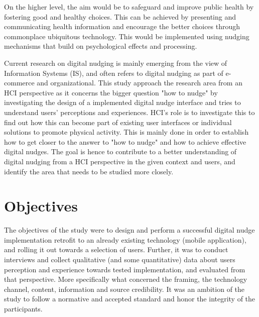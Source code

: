 On the higher level, the aim would be to safeguard and improve public health by fostering good and healthy choices. This can be achieved by presenting and communicating health information and encourage the better choices through commonplace ubiquitous technology. This would be implemented using nudging mechanisms that build on psychological effects and processing. 


Current research on digital nudging is mainly emerging from the view of Information Systems (IS), and often refers to digital nudging as part of e-commerce and organizational. This study approach the research area from an HCI perspective as it concerns the bigger question "how to nudge" by investigating the design of a implemented digital nudge interface and tries to understand users' perceptions and experiences. HCI's role is to investigate this to find out how this can become part of existing user interfaces or individual solutions to promote physical activity. This is mainly done in order to establish how to get closer to the answer to "how to nudge" and how to achieve effective digital nudges. The goal is hence to contribute to a better understanding of digital nudging from a HCI perspective in the given context and users, and identify the area that needs to be studied more closely. 


\section{Objectives}
The objectives of the study were to design and perform a successful digital nudge implementation retrofit to an already existing technology (mobile application), and rolling it out towards a selection of users. Further, it was to conduct interviews and collect qualitative (and some quantitative) data about users perception and experience towards tested implementation, and evaluated from that perspective. More specifically what concerned the framing, the technology channel, content, information and source credibility. It was an ambition of the study to follow a normative and accepted standard and honor the integrity of the participants. 

